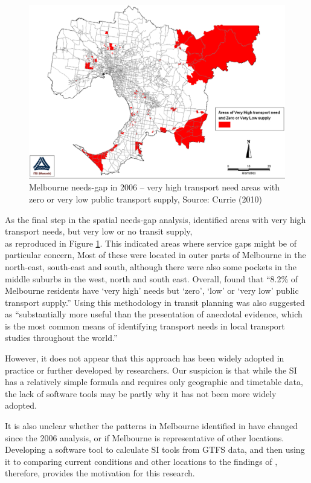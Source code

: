 \documentclass[preprint, 3p,
authoryear]{elsarticle} %
\begin{document}
\begin{figure}
\includegraphics[width=1\linewidth]{graphics/Currie2010gap} \caption{Melbourne needs-gap in 2006 – very high transport need areas with zero or very low public transport supply, Source: Currie (2010)}\label{fig:Currie_map_gap}
\end{figure}

As the final step in the spatial needs-gap analysis,
\citet{currie2010identifying} identified areas with very high transport
needs, but very low or no transit supply,\\
as reproduced in Figure \ref{fig:Currie_map_gap}. This indicated areas
where service gaps might be of particular concern, Most of these were
located in outer parts of Melbourne in the north-east, south-east and
south, although there were also some pockets in the middle suburbs in
the west, north and south east. Overall, \citet{currie2010identifying}
found that ``8.2\% of Melbourne residents have `very high' needs but
`zero', `low' or `very low' public transport supply.'' Using this
methodology in transit planning was also suggested as ``substantially
more useful than the presentation of anecdotal evidence, which is the
most common means of identifying transport needs in local transport
studies throughout the world.''\citep{currie2010identifying}

However, it does not appear that this approach has been widely adopted
in practice or further developed by researchers. Our suspicion is that
while the SI has a relatively simple formula and requires only
geographic and timetable data, the lack of software tools may be partly
why it has not been more widely adopted.

It is also unclear whether the patterns in Melbourne identified in
\citet{currie2010identifying} have changed since the 2006 analysis, or
if Melbourne is representative of other locations. Developing a software
tool to calculate SI tools from GTFS data, and then using it to
comparing current conditions and other locations to the findings of
\citet{currie2010identifying}, therefore, provides the motivation for
this research.
\end{document}
